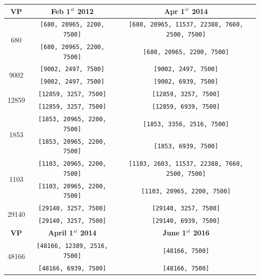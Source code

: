 \begin{table}[!ht]
	\centering
	\begin{tabular}{c c c}
		\hline
		\textbf{VP} & \textbf{Feb 1$^{st}$ 2012}	& \textbf{Apr 1$^{st}$ 2014} \\ \hline\hline
		\multirow{2}{*}{680} & \texttt{\footnotesize [680, 20965, 2200, 7500]}  & \texttt{\footnotesize [680, 20965, 11537, 22388, 7660, 2500, 7500]} \\
		& \texttt{\footnotesize [680, 20965, 2200, 7500]}  & \texttt{\footnotesize [680, 20965, 2200, 7500]} \\ \hline
		
		\multirow{2}{*}{9002} & \texttt{\footnotesize [9002, 2497, 7500]}  & \texttt{\footnotesize [9002, 2497, 7500]} \\
		& \texttt{\footnotesize [9002, 2497, 7500]}  & \texttt{\footnotesize [9002, 6939, 7500]} \\ \hline
		
		\multirow{2}{*}{12859} & \texttt{\footnotesize [12859, 3257, 7500]}  & \texttt{\footnotesize [12859, 3257, 7500]} \\
		& \texttt{\footnotesize[12859, 3257, 7500]}  & \texttt{\footnotesize[12859, 6939, 7500]} \\ \hline
		
		\multirow{2}{*}{1853} & \texttt{\footnotesize [1853, 20965, 2200, 7500]}  & \texttt{\footnotesize [1853, 3356, 2516, 7500]} \\
		& \texttt{\footnotesize[1853, 20965, 2200, 7500]}  & \texttt{\footnotesize[1853, 6939, 7500]} \\ \hline
		
		\multirow{2}{*}{1103} & \texttt{\footnotesize [1103, 20965, 2200, 7500]}  & \texttt{\footnotesize [1103, 2603, 11537, 22388, 7660, 2500, 7500]} \\
		& \texttt{\footnotesize[1103, 20965, 2200, 7500]}  & \texttt{\footnotesize[1103, 20965, 2200, 7500]} \\ \hline
		
		\multirow{2}{*}{29140} & \texttt{\footnotesize [29140, 3257, 7500]}  & \texttt{\footnotesize [29140, 3257, 7500]} \\
		& \texttt{\footnotesize[29140, 3257, 7500]}  & \texttt{\footnotesize[29140, 6939, 7500]} \\ \hline\hline
		
		\textbf{VP} & \textbf{April 1$^{st}$ 2014}	& \textbf{June 1$^{st}$ 2016} \\ \hline\hline
		\multirow{2}{*}{48166} & \texttt{\footnotesize [48166, 12389, 2516, 7500]}  & \texttt{\footnotesize [48166, 7500]} \\
		& \texttt{\footnotesize [48166, 6939, 7500]}  & \texttt{\footnotesize [48166, 7500]} \\ \hline
		

\end{tabular}
\end{table}
